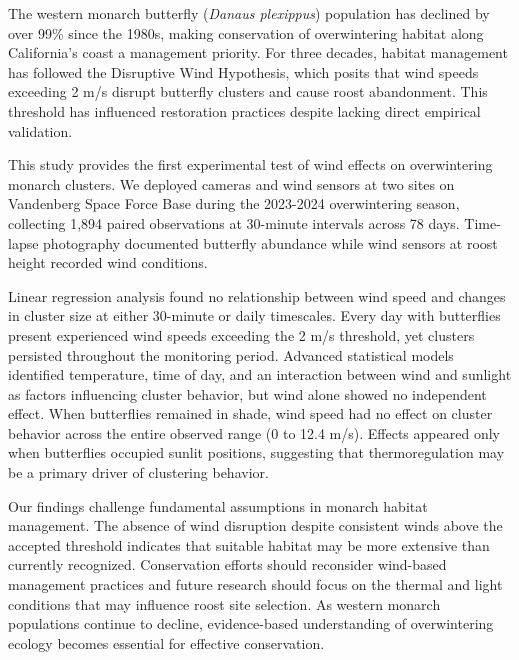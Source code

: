 The western monarch butterfly (\textit{Danaus plexippus}) population has declined by over 99\% since the 1980s, making conservation of overwintering habitat along California's coast a management priority. For three decades, habitat management has followed the Disruptive Wind Hypothesis, which posits that wind speeds exceeding 2 m/s disrupt butterfly clusters and cause roost abandonment. This threshold has influenced restoration practices despite lacking direct empirical validation.

This study provides the first experimental test of wind effects on overwintering monarch clusters. We deployed cameras and wind sensors at two sites on Vandenberg Space Force Base during the 2023-2024 overwintering season, collecting 1,894 paired observations at 30-minute intervals across 78 days. Time-lapse photography documented butterfly abundance while wind sensors at roost height recorded wind conditions.

Linear regression analysis found no relationship between wind speed and changes in cluster size at either 30-minute or daily timescales. Every day with butterflies present experienced wind speeds exceeding the 2 m/s threshold, yet clusters persisted throughout the monitoring period. Advanced statistical models identified temperature, time of day, and an interaction between wind and sunlight as factors influencing cluster behavior, but wind alone showed no independent effect. When butterflies remained in shade, wind speed had no effect on cluster behavior across the entire observed range (0 to 12.4 m/s). Effects appeared only when butterflies occupied sunlit positions, suggesting that thermoregulation may be a primary driver of clustering behavior.

Our findings challenge fundamental assumptions in monarch habitat management. The absence of wind disruption despite consistent winds above the accepted threshold indicates that suitable habitat may be more extensive than currently recognized. Conservation efforts should reconsider wind-based management practices and future research should focus on the thermal and light conditions that may influence roost site selection. As western monarch populations continue to decline, evidence-based understanding of overwintering ecology becomes essential for effective conservation.